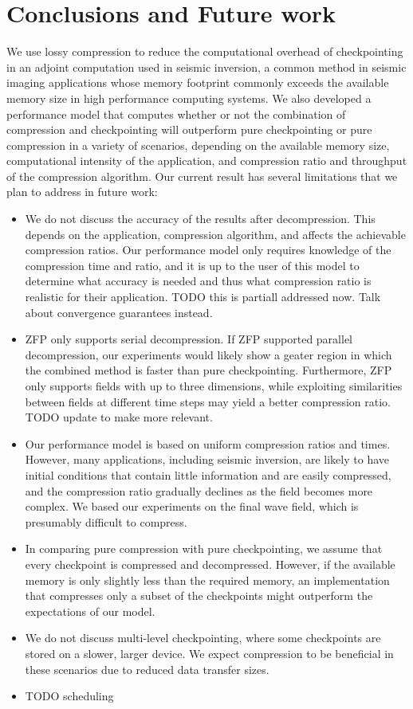 \section{Conclusions and Future work}
We use lossy compression to reduce the computational overhead of
checkpointing in an adjoint computation used in seismic
inversion, a common method in seismic imaging applications whose
memory footprint commonly exceeds the available memory size in high
performance computing systems. We also developed a performance model
that computes whether or not the combination of compression and
checkpointing will outperform pure checkpointing or pure compression
in a variety of scenarios, depending on the available memory size,
computational intensity of the application, and compression ratio and
throughput of the compression algorithm. Our current result has
several limitations that we plan to address in future work:
\begin{itemize}
\item We do not discuss the accuracy of the results after decompression. This
depends on the application, compression algorithm, and affects the achievable
compression ratios. Our performance model only requires knowledge of the
compression time and ratio, and it is up to the user of this model to determine
what accuracy is needed and thus what compression ratio is realistic for their
application. TODO this is partiall addressed now. Talk about
convergence guarantees instead. 
\item ZFP only supports serial decompression. If ZFP supported
parallel decompression, our experiments would likely show a geater region in
which the combined method is faster than pure checkpointing. Furthermore, ZFP
only supports fields with up to three dimensions, while
exploiting similarities between fields at different time steps may yield a
better compression ratio. TODO update to make more relevant.
\item Our performance model is based on uniform compression ratios and
times.  However, many applications, including seismic inversion, are likely to have
initial conditions that contain little information and are easily
compressed, and the compression ratio gradually declines as the field
becomes more complex. We based our experiments on the final wave
field, which is presumably difficult to compress.
\item In comparing pure compression with pure checkpointing, we assume
that every checkpoint is compressed and decompressed. However, if the
available memory is only slightly less than the required memory, an
implementation that compresses only a subset of the checkpoints might
outperform the expectations of our model.
\item We do not discuss multi-level checkpointing, where some
checkpoints are stored on a slower, larger device. We expect
compression to be beneficial in these scenarios due to reduced data
transfer sizes.
\item TODO scheduling
\end{itemize}